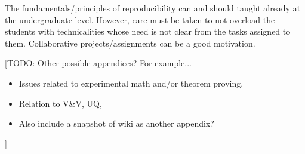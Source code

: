 \documentclass[11pt]{article}
\newcommand{\todo}[1]{{\color{red} [TODO: #1]}}
\newcommand{\todo}[1]{}
\begin{document}
The fundamentals/principles of reproducibility can and should taught already
at the undergraduate level. However, care must be taken to not overload the
students with technicalities whose need is not clear from the tasks assigned
to them.  Collaborative projects/assignments can be a good motivation.

\todo{Other possible appendices? For example...
\begin{itemize}
\item Issues related to experimental math and/or theorem proving.
\item Relation to V\&V, UQ, 
\item Also include a snapshot of wiki as another appendix?
\end{itemize} 
}

\end{document}

